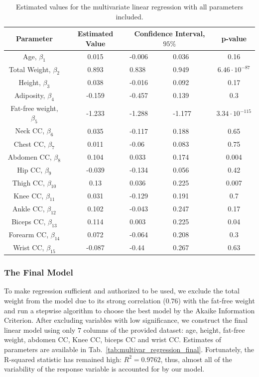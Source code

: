 \documentclass[11pt,american,american]{article}
\begin{document}
\renewcommand{\arraystretch}{1.2}
\begin{table}[H]
	\centering
	\begin{tabular}{|c||c||p{2cm}|p{2cm}|c|}
		\hline 
		Parameter &  Estimated Value & \multicolumn{2}{c|}{Confidence Interval, $95\%$} & p-value \\ 
		\hline \hline 
		Age, $\beta_{1}$ & 0.015 & -0.006 &  0.036 & 0.16 \\ 
		\hline 
		Total Weight, $\beta_{2}$ & 0.893 & 0.838 &  0.949 & $6.46 \cdot 10^{-87}$\\ 
		\hline 
		Height, $\beta_{3}$ & 0.038 & -0.016 & 0.092 & 0.17 \\ 
		\hline
		Adiposity, $\beta_{4}$ & -0.159 & -0.457 & 0.139 & 0.3 \\
		\hline 
		Fat-free weight, $\beta_{5}$ & -1.233 & -1.288 & -1.177 & $3.34 \cdot 10^{-115}$\\
		\hline
		Neck CC, $\beta_{6}$ & 0.035 & -0.117 & 0.188  & 0.65 \\
		\hline
		Chest CC, $\beta_{7}$ & 0.011 & -0.06 & 0.083 & 0.75 \\
		\hline
		Abdomen CC, $\beta_{8}$ & 0.104 & 0.033 & 0.174  & 0.004 \\
		\hline
		Hip CC, $\beta_{9}$ & -0.039 & -0.134 & 0.056 & 0.42 \\
		\hline
		Thigh CC, $\beta_{10}$ & 0.13 & 0.036 & 0.225 & 0.007 \\
		\hline
		Knee CC, $\beta_{11}$ & 0.031 & -0.129 & 0.191 & 0.7 \\
		\hline
		Ankle CC, $\beta_{12}$ & 0.102 & -0.043 & 0.247 & 0.17 \\
		\hline
		Biceps CC, $\beta_{13}$ & 0.114 & 0.003 & 0.225 & 0.04 \\
		\hline
		Forearm CC, $\beta_{14}$ & 0.072 & -0.064 & 0.208 & 0.3 \\
		\hline
		Wrist CC, $\beta_{15}$ & -0.087 & -0.44 & 0.267 & 0.63\\
		\hline
	\end{tabular} 
	\caption{Estimated values for the multivariate linear regression with all parameters included.}
	\label{tab:multivar_regression}
\end{table}



\subsubsection{The Final Model}

To make regression sufficient and authorized to be used, we exclude the total weight from the model due to its strong correlation ($0.76$) with the fat-free weight and run a stepwise algorithm to choose the best model by the Akaike Information Criterion. After excluding variables with low significance, we construct the final linear model using only  $7$ columns of the provided dataset: age, height, fat-free weight, abdomen CC, Knee CC, biceps CC and wrist CC. Estimates of parameters are available in Tab.~\ref{tab:multivar_regression_final}. Fortunately, the R-squared statistic has remained high: $R^{2} = 0.9762$, thus, almost all of the variability of the response variable is accounted for by our model.
\end{document}
